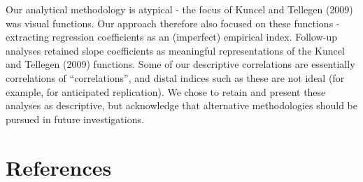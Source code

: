 \documentclass[
  ,jou]{apa6}
\begin{document}
Our analytical methodology is atypical - the focus of Kuncel and Tellegen (2009) was visual functions. Our approach therefore also focused on these functions - extracting regression coefficients as an (imperfect) empirical index. Follow-up analyses retained slope coefficients as meaningful representations of the Kuncel and Tellegen (2009) functions. Some of our descriptive correlations are essentially correlations of ``correlations'', and distal indices such as these are not ideal (for example, for anticipated replication). We chose to retain and present these analyses as descriptive, but acknowledge that alternative methodologies should be pursued in future investigations.

\hypertarget{references}{%
\section{References}\label{references}}

\begingroup
\setlength{\parindent}{-0.5in}
\setlength{\leftskip}{0.5in}
\end{document}
